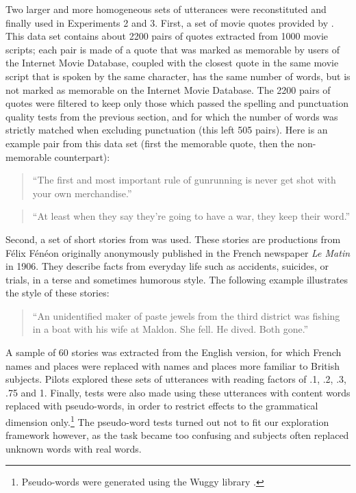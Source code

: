 Two larger and more homogeneous sets of utterances were reconstituted
and finally used in Experiments 2 and 3. First, a set of movie quotes
provided by \textcite{danescu-niculescu-mizil_you_2012}. This data set
contains about 2200 pairs of quotes extracted from 1000 movie scripts;
each pair is made of a quote that was marked as memorable by users of
the Internet Movie Database, coupled with the closest quote in the same
movie script that is spoken by the same character, has the same number
of words, but is not marked as memorable on the Internet Movie Database.
The 2200 pairs of quotes were filtered to keep only those which passed
the spelling and punctuation quality tests from the previous section,
and for which the number of words was strictly matched when excluding
punctuation (this left 505 pairs). Here is an example pair from this
data set (first the memorable quote, then the non-memorable
counterpart):

\begin{quote}
\enquote{The first and most important rule of gunrunning is never get
shot with your own merchandise.}
\end{quote}

\begin{quote}
\enquote{At least when they say they're going to have a war, they keep
their word.}
\end{quote}

Second, a set of short stories from \textcite{feneon_novels_2007} was
used. These stories are productions from Félix Fénéon originally
anonymously published in the French newspaper \emph{Le Matin} in 1906.
They describe facts from everyday life such as accidents, suicides, or
trials, in a terse and sometimes humorous style. The following example
illustrates the style of these stories:

\begin{quote}
\enquote{An unidentified maker of paste jewels from the third district
was fishing in a boat with his wife at Maldon. She fell. He dived. Both
gone.}
\end{quote}

A sample of 60 stories was extracted from the English version, for which
French names and places were replaced with names and places more
familiar to British subjects. Pilots explored these sets of utterances
with reading factors of .1, .2, .3, .75 and 1. Finally, tests were also
made using these utterances with content words replaced with
pseudo-words, in order to restrict effects to the grammatical dimension
only.\footnote{Pseudo-words were generated using the Wuggy library
  \autocite{keuleers_wuggy:_2010}.} The pseudo-word tests turned out not
to fit our exploration framework however, as the task became too
confusing and subjects often replaced unknown words with real words.

